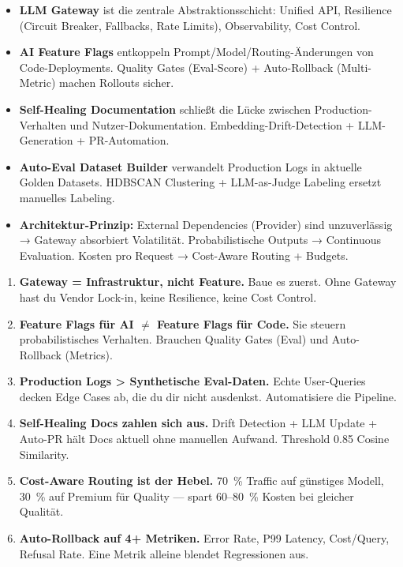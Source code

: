 \begin{zusammenfassungEnv}
\begin{itemize}[leftmargin=*]
    \item \textbf{LLM Gateway} ist die zentrale Abstraktionsschicht: Unified API, Resilience (Circuit Breaker, Fallbacks, Rate Limits), Observability, Cost Control.
    \item \textbf{AI Feature Flags} entkoppeln Prompt/Model/Routing-Änderungen von Code-Deployments. Quality Gates (Eval-Score) + Auto-Rollback (Multi-Metric) machen Rollouts sicher.
    \item \textbf{Self-Healing Documentation} schließt die Lücke zwischen Production-Verhalten und Nutzer-Dokumentation. Embedding-Drift-Detection + LLM-Generation + PR-Automation.
    \item \textbf{Auto-Eval Dataset Builder} verwandelt Production Logs in aktuelle Golden Datasets. HDBSCAN Clustering + LLM-as-Judge Labeling ersetzt manuelles Labeling.
    \item \textbf{Architektur-Prinzip:} External Dependencies (Provider) sind unzuverlässig → Gateway absorbiert Volatilität. Probabilistische Outputs → Continuous Evaluation. Kosten pro Request → Cost-Aware Routing + Budgets.
\end{itemize}
\end{zusammenfassungEnv}


\par\mbox{}\par
\begin{merkeEnv}
\begin{enumerate}
    \item \textbf{Gateway = Infrastruktur, nicht Feature.} Baue es zuerst. Ohne Gateway hast du Vendor Lock-in, keine Resilience, keine Cost Control.
    \item \textbf{Feature Flags für AI $\neq$ Feature Flags für Code.} Sie steuern probabilistisches Verhalten. Brauchen Quality Gates (Eval) und Auto-Rollback (Metrics).
    \item \textbf{Production Logs > Synthetische Eval-Daten.} Echte User-Queries decken Edge Cases ab, die du dir nicht ausdenkst. Automatisiere die Pipeline.
    \item \textbf{Self-Healing Docs zahlen sich aus.} Drift Detection + LLM Update + Auto-PR hält Docs aktuell ohne manuellen Aufwand. Threshold 0.85 Cosine Similarity.
    \item \textbf{Cost-Aware Routing ist der Hebel.} 70~\% Traffic auf günstiges Modell, 30~\% auf Premium für Quality — spart 60–80~\% Kosten bei gleicher Qualität.
    \item \textbf{Auto-Rollback auf 4+ Metriken.} Error Rate, P99 Latency, Cost/Query, Refusal Rate. Eine Metrik alleine blendet Regressionen aus.
\end{enumerate}
\end{merkeEnv}

